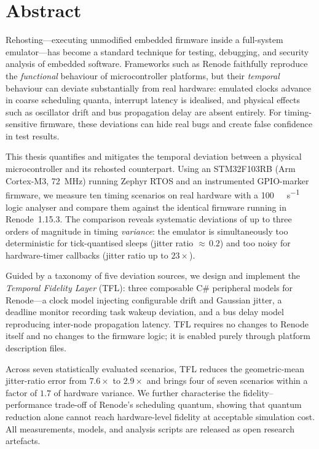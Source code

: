 \chapter*{Abstract}

Rehosting---executing unmodified embedded firmware inside a full-system
emulator---has become a standard technique for testing, debugging, and
security analysis of embedded software. Frameworks such as Renode
faithfully reproduce the \emph{functional} behaviour of microcontroller
platforms, but their \emph{temporal} behaviour can deviate substantially
from real hardware: emulated clocks advance in coarse scheduling quanta,
interrupt latency is idealised, and physical effects such as oscillator
drift and bus propagation delay are absent entirely. For timing-sensitive
firmware, these deviations can hide real bugs and create false confidence
in test results.

This thesis quantifies and mitigates the temporal deviation between a
physical microcontroller and its rehosted counterpart. Using an
STM32F103RB (Arm Cortex-M3, \SI{72}{\mega\hertz}) running Zephyr RTOS and
an instrumented GPIO-marker firmware, we measure ten timing scenarios on
real hardware with a \SI{100}{\mega\sample\per\second} logic analyser and compare them
against the identical firmware running in Renode~1.15.3. The comparison
reveals systematic deviations of up to three orders of magnitude in
timing \emph{variance}: the emulator is simultaneously too deterministic
for tick-quantised sleeps (jitter ratio ${\approx}\,0.2$) and too noisy
for hardware-timer callbacks (jitter ratio up to $23{\times}$).

Guided by a taxonomy of five deviation sources, we design and implement
the \emph{Temporal Fidelity Layer} (TFL): three composable C\# peripheral
models for Renode---a clock model injecting configurable drift and
Gaussian jitter, a deadline monitor recording task wakeup deviation, and
a bus delay model reproducing inter-node propagation latency. TFL
requires no changes to Renode itself and no changes to the firmware
logic; it is enabled purely through platform description files.

Across seven statistically evaluated scenarios, TFL reduces the
geometric-mean jitter-ratio error from $7.6{\times}$ to $2.9{\times}$
and brings four of seven scenarios within a factor of $1.7$ of hardware
variance. We further characterise the fidelity--performance trade-off of
Renode's scheduling quantum, showing that quantum reduction alone cannot
reach hardware-level fidelity at acceptable simulation cost. All
measurements, models, and analysis scripts are released as open
research artefacts.
